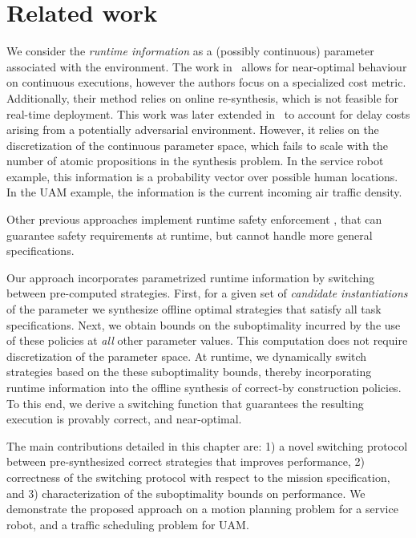 \section{Related work}

We consider the \emph{runtime information} as a (possibly continuous) parameter associated with the environment. The work in~\cite{jangcontinuous} allows for near-optimal behaviour on continuous executions, however the authors focus on a specialized cost metric. Additionally, their method relies on online re-synthesis, which is not feasible for real-time deployment. This work was later extended in~\cite{Ehlerscost} to account for delay costs arising from a potentially adversarial environment. However, it relies on the discretization of the continuous parameter space, which fails to scale with the number of atomic propositions in the synthesis problem. 
In the service robot example, this information is a probability vector over possible human locations. In the UAM example, the information is the current incoming air traffic density.  

Other previous approaches implement runtime safety enforcement \cite{bhnfm, AlshiekhShield,Konighofer2017,8815233}, that can guarantee safety requirements at runtime, but cannot handle more general specifications.

Our approach incorporates parametrized runtime information by switching between pre-computed strategies. First, for a given set of \emph{candidate instantiations} of the parameter we synthesize offline optimal strategies that satisfy all task specifications. Next, we obtain bounds on the suboptimality incurred by the use of these policies at \emph{all} other parameter values. This computation does not require discretization of the parameter space. At runtime, we dynamically switch strategies based on the these suboptimality bounds, thereby incorporating runtime information into the offline synthesis of correct-by construction policies. 
To this end, we derive a switching function that guarantees the resulting execution is provably correct, and near-optimal.

The main contributions detailed in this chapter are: 1) a novel switching protocol between pre-synthesized correct strategies that improves performance, 2) correctness of the switching protocol with respect to the mission specification, and 3) characterization of the suboptimality bounds on performance. We demonstrate the proposed approach on a motion planning problem for a service robot, and a traffic scheduling problem for UAM. 

